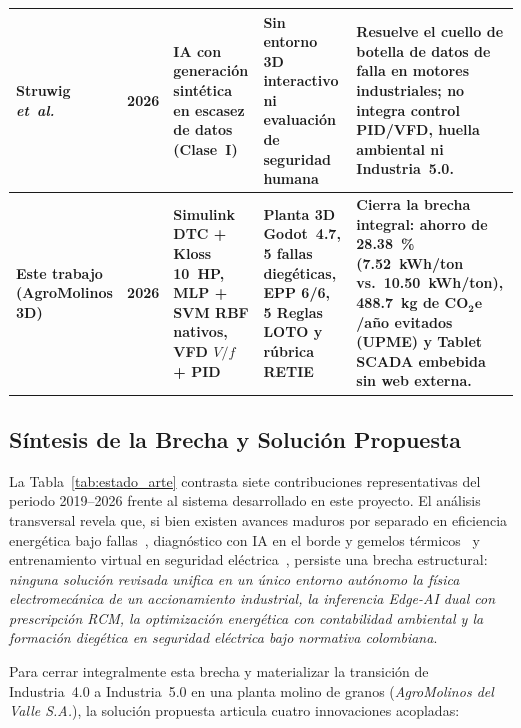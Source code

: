 \begin{table}[!t]
\begin{tabularx}{\textwidth}{@{} R{2.3cm} c R{3.2cm} R{3.5cm} Y @{}}
\addlinespace[2pt]
Struwig \emph{et~al.}~\cite{AI2026} & 2026 & IA con generación sintética en escasez de datos (Clase~I) & Sin entorno 3D interactivo ni evaluación de seguridad humana & Resuelve el cuello de botella de datos de falla en motores industriales; no integra control PID/VFD, huella ambiental ni Industria~5.0. \\
\midrule
\textbf{Este trabajo (AgroMolinos 3D)} & \textbf{2026} & \textbf{Simulink DTC + Kloss \qty[mode=text]{10}{HP}, MLP + SVM RBF nativos, VFD $V/f$ + PID} & \textbf{Planta 3D Godot~4.7, 5 fallas diegéticas, EPP 6/6, 5 Reglas LOTO y rúbrica RETIE} & \textbf{Cierra la brecha integral: ahorro de \qty[mode=text]{28.38}{\percent} (\qty[mode=text]{7.52}{kWh/ton} vs.\ \qty[mode=text]{10.50}{kWh/ton}), \qty[mode=text]{488.7}{\kilo\gram} de $\mathbf{CO_2e}$/año evitados (UPME) y Tablet SCADA embebida sin web externa.} \\
\bottomrule
\end{tabularx}
\endgroup
\end{table}

\subsection{Síntesis de la Brecha y Solución Propuesta}\label{subsec:sintesis_brecha}

La Tabla~\ref{tab:estado_arte} contrasta siete contribuciones representativas del periodo 2019--2026 frente al sistema desarrollado en este proyecto. El análisis transversal revela que, si bien existen avances maduros por separado en eficiencia energética bajo fallas~\cite{Garcia2019,Resa2019,Adamou2024}, diagnóstico con IA en el borde y gemelos térmicos~\cite{Gangsar2020,EdgeCloud2022,Fog2025,Thermal2025,AI2026} y entrenamiento virtual en seguridad eléctrica~\cite{Stefan2023,Stefan2024}, persiste una brecha estructural: \emph{ninguna solución revisada unifica en un único entorno autónomo la física electromecánica de un accionamiento industrial, la inferencia Edge-AI dual con prescripción RCM, la optimización energética con contabilidad ambiental y la formación diegética en seguridad eléctrica bajo normativa colombiana}.

Para cerrar integralmente esta brecha y materializar la transición de Industria~4.0 a Industria~5.0 en una planta molino de granos (\emph{AgroMolinos del Valle S.A.}), la solución propuesta articula cuatro innovaciones acopladas:

